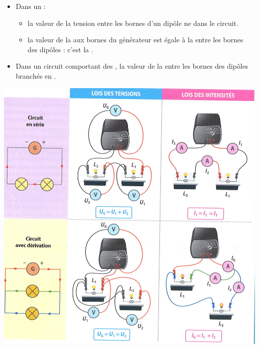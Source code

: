 \documentclass[xcolor={dvipsnames}]{beamer}
\begin{document}
\begin{frame}


\begin{mybilan}
	\begin{itemize}
		\item Dans un  :\pause
		\begin{itemize}
			\item la valeur de la tension entre les bornes d'un dipôle ne  dans le circuit.\pause
			\item la valeur de la  aux bornes du générateur est égale à la  entre les bornes des dipôles : c'est la .\pause
		\end{itemize}
		
		
		\item Dans un circuit comportant des , la valeur de la  entre les bornes des dipôles branchés en .
		
		
	\end{itemize}
\end{mybilan}
\end{frame}


\begin{frame}
	\begin{center}
		\includegraphics[scale=0.5]{lois_elec}
	\end{center}
\end{frame}

%
%	
%
%
%	
\end{document}
